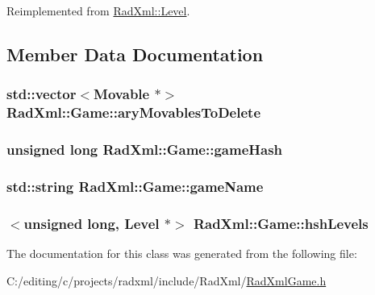 Reimplemented from \hyperlink{class_rad_xml_1_1_level_ac7845bc40a2077c0c9da6b19ba5e82a5}{Rad\-Xml\-::\-Level}.



\subsection{Member Data Documentation}
\hypertarget{class_rad_xml_1_1_game_a7186c002bcf30641657bd3b92fac6557}{
\subsubsection[{ary\-Movables\-To\-Delete}]{\setlength{\rightskip}{0pt plus 5cm}std\-::vector$<${\bf Movable} $\ast$$>$ Rad\-Xml\-::\-Game\-::ary\-Movables\-To\-Delete\hspace{0.3cm}{\ttfamily [protected]}}}\label{class_rad_xml_1_1_game_a7186c002bcf30641657bd3b92fac6557}
\hypertarget{class_rad_xml_1_1_game_afbd8616a2f0521361a742eb3cd69e76c}{
\subsubsection[{game\-Hash}]{\setlength{\rightskip}{0pt plus 5cm}unsigned long Rad\-Xml\-::\-Game\-::game\-Hash\hspace{0.3cm}{\ttfamily [protected]}}}\label{class_rad_xml_1_1_game_afbd8616a2f0521361a742eb3cd69e76c}
\hypertarget{class_rad_xml_1_1_game_acfa184f816c42afb462e985c0c6791e6}{
\subsubsection[{game\-Name}]{\setlength{\rightskip}{0pt plus 5cm}std\-::string Rad\-Xml\-::\-Game\-::game\-Name\hspace{0.3cm}{\ttfamily [protected]}}}\label{class_rad_xml_1_1_game_acfa184f816c42afb462e985c0c6791e6}
\hypertarget{class_rad_xml_1_1_game_aea067e9ef6053bce626d3a41459619e5}{
\subsubsection[{hsh\-Levels}]{$<$unsigned long, {\bf Level} $\ast$$>$ Rad\-Xml\-::\-Game\-::hsh\-Levels\hspace{0.3cm}{\ttfamily [protected]}}}\label{class_rad_xml_1_1_game_aea067e9ef6053bce626d3a41459619e5}


The documentation for this class was generated from the following file\-:\begin{DoxyCompactItemize}
\item 
C\-:/editing/c/projects/radxml/include/\-Rad\-Xml/\hyperlink{_rad_xml_game_8h}{Rad\-Xml\-Game.\-h}\end{DoxyCompactItemize}
